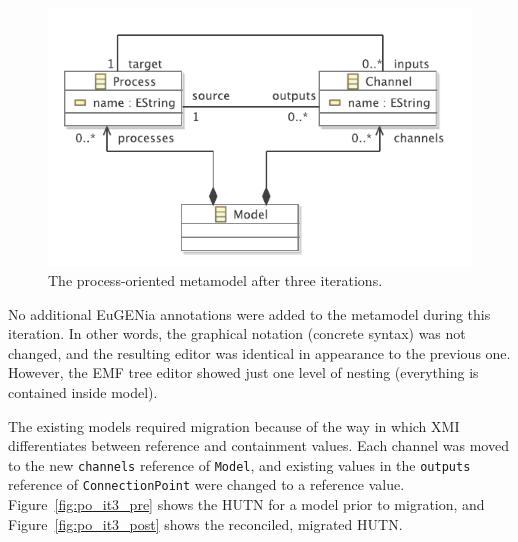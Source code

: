 \begin{figure}[htbp]
	\centering
		\includegraphics[scale=0.75]{A.2.ProcessOriented/images/3_mm.pdf}
	\caption{The process-oriented metamodel after three iterations.}
	\label{fig:po_it3_mm}
\end{figure}

No additional EuGENia annotations were added to the metamodel during this iteration. In other words, the graphical notation (concrete syntax) was not changed, and the resulting editor was identical in appearance to the previous one. However, the EMF tree editor showed just one level of nesting (everything is contained inside model).

The existing models required migration because of the way in which XMI differentiates between reference and containment values. Each channel was moved to the new \texttt{ch\-an\-ne\-ls} reference of \texttt{Mo\-d\-el}, and existing values in the \texttt{ou\-tp\-u\-ts} reference of \texttt{Co\-nn\-ec\-ti\-onPo\-in\-t} were changed to a reference value. Figure~\ref{fig:po_it3_pre} shows the HUTN for a model prior to migration, and Figure~\ref{fig:po_it3_post} shows the reconciled, migrated HUTN.


